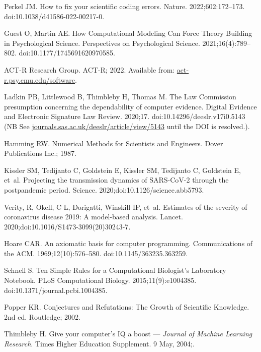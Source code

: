 \documentclass[10pt,letterpaper]{article}
\begin{document}
{\begin{thebibliography}{10}
Perkel JM.
\newblock How to fix your scientific coding errors.
\newblock Nature. 2022;602:172--173.
\newblock doi:{10.1038/d41586-022-00217-0}.

Guest O, Martin AE.
\newblock How Computational Modeling Can Force Theory Building in Psychological
  Science.
\newblock Perspectives on Psychological Science. 2021;16(4):789--802.
\newblock doi:{10.1177/1745691620970585}.

{ACT-R Research Group}. ACT-R; 2022.
\newblock Available from: \url{act-r.psy.cmu.edu/software}.

Ladkin PB, Littlewood B, Thimbleby H, Thomas M.
\newblock The {Law Commission} presumption concerning the dependability of
  computer evidence.
\newblock Digital Evidence and Electronic Signature Law Review. 2020;17.
\newblock doi:{10.14296/deeslr.v17i0.5143 (NB See
  \url{journals.sas.ac.uk/deeslr/article/view/5143} until the DOI is
  resolved.)}.

Hamming RW.
\newblock Numerical Methods for Scientists and Engineers.
\newblock Dover Publications Inc.; 1987.

Kissler SM, Tedijanto C, Goldstein E, Kissler SM, Tedijanto C, Goldstein E,
  et~al.
\newblock Projecting the transmission dynamics of {SARS-CoV-2} through the
  postpandemic period.
\newblock Science. 2020;doi:{10.1126/science.abb5793}.

Verity, R, Okell, C L, Dorigatti, Winskill IP, et~al.
\newblock Estimates of the severity of coronavirus disease 2019: {A}
  model-based analysis.
\newblock Lancet. 2020;doi:{10.1016/S1473-3099(20)30243-7}.

Hoare CAR.
\newblock An axiomatic basis for computer programming.
\newblock Communications of the ACM. 1969;12(10):576--580.
\newblock doi:{10.1145/363235.363259}.

Schnell S.
\newblock Ten Simple Rules for a Computational Biologist's Laboratory Notebook.
\newblock PLoS Computational Biology. 2015;11(9):e1004385.
\newblock doi:{10.1371/journal.pcbi.1004385}.

Popper KR.
\newblock Conjectures and Refutations: {The} Growth of Scientific Knowledge.
\newblock 2nd ed. Routledge; 2002.

Thimbleby H.
\newblock Give your computer's {IQ} a boost --- {{\emph{{Journal of Machine
  Learning Research}}}}.
\newblock Times Higher Education Supplement. 9 May, 2004;.


\end{thebibliography}}
\end{document}
